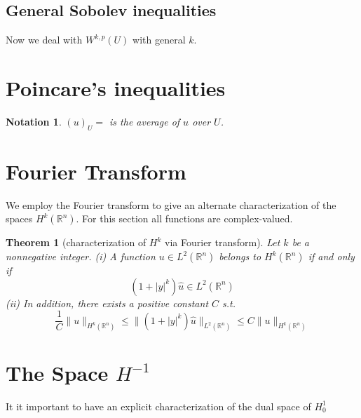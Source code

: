 \documentclass{article}
\newtheorem{theorem}{Theorem}[section]
\newtheorem{notation}{Notation}
\theoremstyle{definition}
\begin{document}
\subsection{General Sobolev inequalities}
Now we deal with $W^{k,p}(U)$ with general $k$.


\section{Poincare's inequalities}
\begin{notation}
    $(u)_U=$ is the average of $u$ over $U$.
\end{notation}

\section{Fourier Transform}
We employ the Fourier transform to give an alternate characterization of the spaces $H^k(\mathbb{R}^n)$.
For this section all functions are complex-valued.
\begin{theorem}[characterization of $H^k$ via Fourier transform]
    Let $k$ be a nonnegative integer.\newline 
    (i) A function $u\in L^2(\mathbb{R}^n)$ belongs to $H^k(\mathbb{R}^n)$ if and only if 
    \[ (1+|y|^k)\hat{u}\in L^2(\mathbb{R}^n)\] 
    (ii) In addition, there exists a positive constant $C$ s.t. 
    \[ \frac{1}{C}\|u\|_{H^k(\mathbb{R}^n)}\le \| (1+|y|^k)\hat{u}\|_{L^2(\mathbb{R}^n)}\le C\|u\|_{H^k(\mathbb{R}^n)} \]
\end{theorem}


\section{The Space $H^{-1}$}
It it important to have an explicit characterization of the dual space of $H^1_0$
\end{document}
